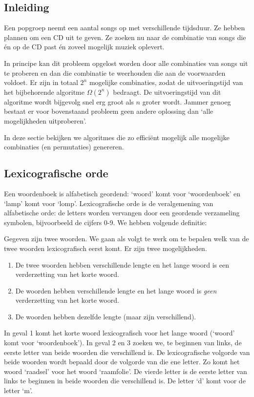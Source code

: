 \subsection{Inleiding}
Een popgroep neemt een aantal songs op met verschillende tijdsduur. Ze hebben plannen om een CD uit te geven. Ze zoeken nu naar de combinatie van songs die én op de CD past én zoveel mogelijk muziek oplevert.

In principe kan dit probleem opgelost worden door alle combinaties van songs uit te proberen en dan die combinatie te weerhouden die aan de voorwaarden voldoet. Er zijn in totaal $2^n$ mogelijke combinaties, zodat de uitvoeringstijd van het bijbehorende algoritme $\Omega(2^n)$ bedraagt. De uitvoeringstijd van dit algoritme wordt bijgevolg snel erg groot als $n$ groter wordt. Jammer genoeg bestaat er voor bovenstaand probleem geen andere oplossing dan `alle mogelijkheden uitproberen'. 

In deze sectie bekijken we algoritmes die zo efficiënt mogelijk alle mogelijke combinaties (en permutaties) genereren.

\subsection{Lexicografische orde}
Een woordenboek is alfabetisch geordend: `woord' komt voor `woordenboek' en `lamp' komt voor `lomp'.  Lexicografische orde is de veralgemening van alfabetische orde: de letters worden vervangen door een geordende verzameling symbolen, bijvoorbeeld de cijfers 0-9. We hebben volgende definitie:

Gegeven zijn twee woorden. We gaan als volgt te werk om te bepalen welk van de twee woorden lexicografisch eerst komt. Er zijn twee mogelijkheden.
\begin{enumerate}
\item De twee woorden hebben verschillende lengte en het lange woord is een verderzetting van het korte woord.
\item De woorden hebben verschillende lengte en het lange woord is \emph{geen} verderzetting van het korte woord.
\item De woorden hebben dezelfde lengte (maar zijn verschillend).
\end{enumerate}
In geval 1 komt het korte woord lexicografisch voor het lange woord (`woord' komt voor `woordenboek'). In geval 2 en 3 zoeken we, te beginnen van links, de eerste letter van beide woorden die verschillend is. De lexicografische volgorde van beide woorden wordt bepaald door de volgorde van die ene letter. Zo komt het woord `raadsel' voor het woord `raamfolie'. De vierde letter is de eerste letter van links te beginnen in beide woorden die verschillend is. De letter `d' komt voor de letter `m'.


